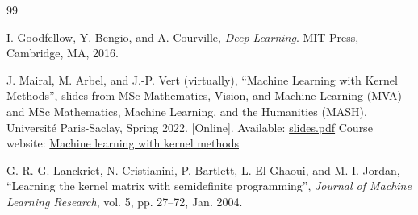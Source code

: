 \begin{thebibliography}{99}

I. Goodfellow, Y. Bengio, and A. Courville, 
\textit{Deep Learning}. 
MIT Press, Cambridge, MA, 2016.

J. Mairal, M. Arbel, and J.-P. Vert (virtually), 
\enquote{Machine Learning with Kernel Methods}, 
slides from MSc Mathematics, Vision, and Machine Learning (MVA) and MSc Mathematics, Machine Learning, and the Humanities (MASH), 
Université Paris-Saclay, Spring 2022. [Online]. Available: \href{https://mva-kernel-methods.github.io/course-2021-2022/static_files/materials/slides.pdf}{slides.pdf}
Course website: \href{https://mva-kernel-methods.github.io/course-2021-2022/}{Machine learning with kernel methods}

G. R. G. Lanckriet, N. Cristianini, P. Bartlett, L. El Ghaoui, and M. I. Jordan, 
\enquote{Learning the kernel matrix with semidefinite programming}, 
\textit{Journal of Machine Learning Research}, vol. 5, pp. 27–72, Jan. 2004.

\end{thebibliography}